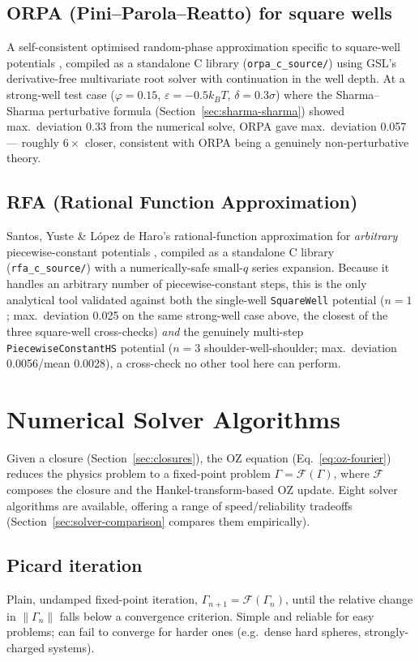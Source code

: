 \documentclass[11pt,a4paper]{article}
\newcommand{\code}[1]{\texttt{#1}}
\begin{document}
\subsection{ORPA (Pini--Parola--Reatto) for square wells}
A self-consistent optimised random-phase approximation specific to square-well
potentials \cite{pini2002}, compiled as a standalone C library
(\code{orpa\_c\_source/}) using
GSL's derivative-free multivariate root solver with continuation in the well
depth. At a strong-well test case ($\varphi=0.15$, $\varepsilon=-0.5k_BT$,
$\delta=0.3\sigma$) where the Sharma--Sharma perturbative formula
(Section~\ref{sec:sharma-sharma}) showed max.\ deviation 0.33 from the
numerical solve, ORPA gave max.\ deviation 0.057 --- roughly $6\times$ closer,
consistent with ORPA being a genuinely non-perturbative theory.

\subsection{RFA (Rational Function Approximation)}
\label{sec:rfa}
Santos, Yuste \& L\'opez de Haro's rational-function approximation for
\emph{arbitrary} piecewise-constant potentials \cite{santos2012}, compiled as
a standalone C library
(\code{rfa\_c\_source/}) with a numerically-safe small-$q$ series expansion.
Because it handles an arbitrary number of piecewise-constant steps, this is
the only analytical tool validated against both the single-well
\code{SquareWell} potential ($n=1$; max.\ deviation 0.025 on the same
strong-well case above, the closest of the three square-well
cross-checks) \emph{and} the genuinely multi-step
\code{PiecewiseConstantHS} potential ($n=3$ shoulder-well-shoulder; max.\
deviation 0.0056/mean 0.0028), a cross-check no other tool here can perform.

\clearpage
\section{Numerical Solver Algorithms}
\label{sec:solvers}

Given a closure (Section~\ref{sec:closures}), the OZ equation
(Eq.~\ref{eq:oz-fourier}) reduces the physics problem to a fixed-point problem
$\Gamma = \mathcal{F}(\Gamma)$, where $\mathcal{F}$ composes the closure and the
Hankel-transform-based OZ update. Eight solver algorithms are available,
offering a range of speed/reliability tradeoffs (Section~\ref{sec:solver-comparison}
compares them empirically).

\subsection{Picard iteration}
Plain, undamped fixed-point iteration, $\Gamma_{n+1}=\mathcal{F}(\Gamma_n)$,
until the relative change in $\|\Gamma_n\|$ falls below a convergence
criterion. Simple and reliable for easy problems; can fail to converge for
harder ones (e.g.\ dense hard spheres, strongly-charged systems).
\end{document}
